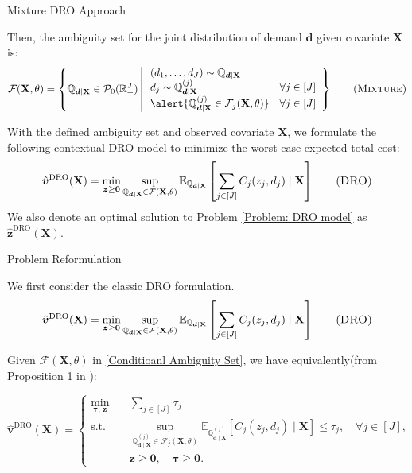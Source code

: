 \documentclass{beamer}
\newcommand{\mb}[1]{{\mathbf{#1}}}
\newcommand{\bbq}{\mathbb{Q}}
\newcommand{\bbr}{\mathbb{R}}
\begin{document}
\begin{frame}{Mixture DRO Approach}

Then, the ambiguity set for the joint distribution of demand $\bm d$ given covariate $\mb X$ is:
{\large
\begin{equation}
\mathcal{F}(\mb X, \theta) = \left \{ 
	\bbq_{\bm d \mid \mb X} \in \mathcal{P}_0(\bbr^J_+) \ 
	\begin{array}{|ll} 
	\ (d_1, \ldots, d_J) \sim \bbq_{\bm d \mid \mb X} \\ 
	\ d_j \sim \bbq^{(j)}_{\bm d \mid \mb X} & \forall j \in [J] \\ \
	\alert{\bbq^{(j)}_{\bm d \mid \mb X} \in \mathcal{F}_j(\mb X, \theta)} & \forall j \in [J] 
	\end{array}
	\right  \}
\label{Conditioanl Ambiguity Set}
\tag{\sc{Mixture}}
\end{equation}
}

With the defined ambiguity set and observed covariate $\mb X$, we formulate the following contextual DRO model to minimize the worst-case expected total cost:
{\large
\begin{equation}
\hat{\bm v}^{\text{DRO}}({\mb X})  = \min_{\bm z \geq \bm 0} \sup_{\bbq_{\bm d \mid \mb X} \in \mathcal{F}(\mb X, \theta)}  \mathbb{E}_{\bbq_{\bm d \mid \mb X}} \left[\sum_{j \in [J]}   C_j (z_j,  d_j)  \mid \mb X \right] 
\label{Problem: DRO model}
\tag{\sc{DRO}}
\end{equation}
}
We also denote an optimal solution to Problem \eqref{Problem: DRO model} as $\hat{\bm z}^{\text{DRO}}({\mb X})$.

\end{frame}


\begin{frame}{Problem Reformulation}

We first consider the classic DRO formulation.
{\large
\begin{equation}
\hat{\bm v}^{\text{DRO}}({\mb X})  = \min_{\bm z \geq \bm 0} \sup_{\bbq_{\bm d \mid \mb X} \in \mathcal{F}(\mb X, \theta)}  \mathbb{E}_{\bbq_{\bm d \mid \mb X}} \left[\sum_{j \in [J]}   C_j (z_j,  d_j)  \mid \mb X \right] 
\tag{\sc{DRO}}
\end{equation}
}

Given $\mathcal{F}(\mb X, \theta)$ in \eqref{Conditioanl Ambiguity Set}, we have equivalently(from Proposition 1 in \citet{hu2025budget}):

\begin{equation}
\hat{\bm v}^{\mathrm{DRO}}(\mb X)
=
\left\{
\begin{aligned}
\min_{\bm\tau,\,\bm z} \quad
& \sum_{j \in [J]} \tau_j \\
\text{s.t.} \quad
& \sup_{\bbq^{(j)}_{\bm d \mid \mb X} \in \mathcal{F}_j(\mb X, \theta)}
\mathbb{E}_{\bbq^{(j)}_{\bm d \mid \mb X}}
\!\left[
    C_j(z_j, d_j) \mid \mb X
\right]
\le \tau_j,
\quad \forall j \in [J], \\
& \bm z \ge \bm 0,\quad \bm\tau \ge \bm 0 .
\end{aligned}
\right.
\end{equation}


\end{frame}
\end{document}
